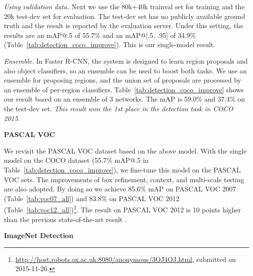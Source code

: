 \documentclass[10pt,twocolumn,letterpaper]{article}
\begin{document}
\vspace{.5em}
\noindent\emph{Using validation data.} Next we use the 80k+40k trainval set for training and the 20k test-dev set for evaluation. The test-dev set has no publicly available ground truth and the result is reported by the evaluation server. Under this setting, the results are an mAP@.5 of 55.7\% and an mAP@[.5, .95] of 34.9\% (Table~\ref{tab:detection_coco_improve}). This is our single-model result.

\vspace{.5em}
\noindent\emph{Ensemble.} In Faster R-CNN, the system is designed to learn region proposals and also object classifiers, so an ensemble can be used to boost both tasks. We use an ensemble for proposing regions, and the union set of proposals are processed by an ensemble of per-region classifiers.
Table~\ref{tab:detection_coco_improve} shows our result based on an ensemble of 3 networks. The mAP is 59.0\% and 37.4\% on the test-dev set. \emph{This result won the 1st place in the detection task in COCO 2015.}


\vspace{1em}
\noindent\textbf{PASCAL VOC}

We revisit the PASCAL VOC dataset based on the above model. With the single model on the COCO dataset (55.7\% mAP@.5 in Table~\ref{tab:detection_coco_improve}), we fine-tune this model on the PASCAL VOC sets. The improvements of box refinement, context, and multi-scale testing are also adopted. By doing so we achieve 85.6\% mAP on PASCAL VOC 2007 (Table~\ref{tab:voc07_all}) and 83.8\% on PASCAL VOC 2012 (Table~\ref{tab:voc12_all})\footnote{\fontsize{6.5pt}{1em}\selectfont\url{http://host.robots.ox.ac.uk:8080/anonymous/3OJ4OJ.html}, submitted on 2015-11-26.}. The result on PASCAL VOC 2012 is 10 points higher than the previous state-of-the-art result \cite{Gidaris2015}.


\vspace{1em}
\noindent\textbf{ImageNet Detection}
\end{document}
